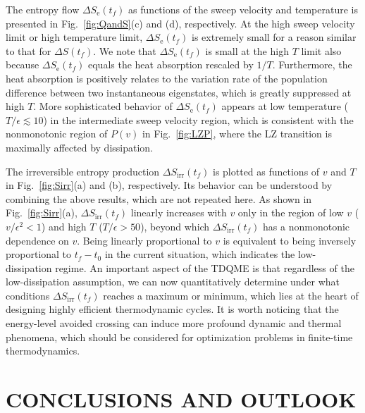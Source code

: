 \documentclass[english,nofootinbib, pra, twocolumn,superscriptaddress]{revtex4-1}
\begin{document}
The entropy flow $\Delta S_{\text{e}}(t_{f})$ as functions of the sweep
velocity and temperature is presented in Fig.~\ref{fig:QandS}(c)
and (d), respectively. At the high sweep velocity limit or high temperature
limit, $\Delta S_{\text{e}}(t_{f})$ is extremely small for a reason similar to that for $\Delta S(t_{f})$. We note that $\Delta S_{\text{e}}(t_{f})$ is small at the high $T$ limit also
because $\Delta S_{\text{e}}(t_{f})$ equals the heat absorption rescaled
by $1/T$. Furthermore, the heat absorption is positively relates to the variation
rate of the population difference between two instantaneous eigenstates,
which is greatly suppressed at high $T$. More sophisticated behavior
of $\Delta S_{\text{e}}(t_{f})$ appears at low temperature ($T/\epsilon\apprle10$)
in the intermediate sweep velocity region, which is consistent with the nonmonotonic region of $P(v)$ in Fig.~\ref{fig:LZP},
where the LZ transition is maximally affected by dissipation. 

The irreversible entropy production $\Delta S_{\text{irr}}(t_{f})$
is plotted as functions of $v$ and $T$ in Fig.~\ref{fig:Sirr}(a)
and (b), respectively. Its behavior can be understood by combining
the above results, which are not repeated here. As shown in Fig.~\ref{fig:Sirr}(a),
$\Delta S_{\text{irr}}(t_{f})$ linearly increases with $v$ only in the
region of low $v$ ($v/\epsilon^{2}<1$) and high $T$ ($T/\epsilon>50$), beyond which $\Delta S_{\text{irr}}(t_{f})$ has a  nonmonotonic dependence on $v$. 
Being linearly proportional to $v$ is equivalent to being inversely proportional to $t_f-t_0$ in the current situation, 
which indicates the low-dissipation regime. An important
aspect of the TDQME is that regardless of the low-dissipation assumption, we can now quantitatively determine under what conditions $\Delta S_{\text{irr}}(t_{f})$ reaches a maximum or minimum, which lies at the heart of designing highly
efficient thermodynamic cycles. It is worth noticing that the energy-level avoided crossing can induce more profound dynamic and thermal phenomena, which should be considered for optimization problems in finite-time thermodynamics.


\section{CONCLUSIONS AND OUTLOOK}
\end{document}
